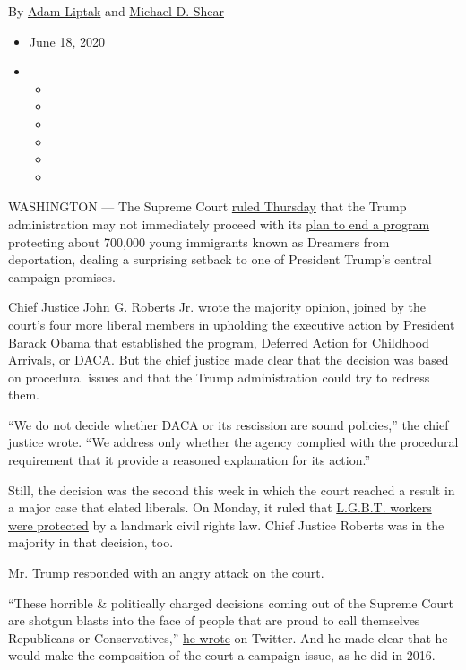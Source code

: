 By \href{https://www.nytimes3xbfgragh.onion/by/adam-liptak}{Adam Liptak}
and \href{https://www.nytimes3xbfgragh.onion/by/michael-d-shear}{Michael
D. Shear}

\begin{itemize}
\item
  June 18, 2020
\item
  \begin{itemize}
  \item
  \item
  \item
  \item
  \item
  \item
  \end{itemize}
\end{itemize}

WASHINGTON --- The Supreme Court
\href{https://www.supremecourt.gov/opinions/19pdf/18-587_5ifl.pdf}{ruled
Thursday} that the Trump administration may not immediately proceed with
its
\href{https://www.nytimes3xbfgragh.onion/2017/09/05/us/politics/trump-daca-dreamers-immigration.html}{plan
to end a program} protecting about 700,000 young immigrants known as
Dreamers from deportation, dealing a surprising setback to one of
President Trump's central campaign promises.

Chief Justice John G. Roberts Jr. wrote the majority opinion, joined by
the court's four more liberal members in upholding the executive action
by President Barack Obama that established the program, Deferred Action
for Childhood Arrivals, or DACA. But the chief justice made clear that
the decision was based on procedural issues and that the Trump
administration could try to redress them.

``We do not decide whether DACA or its rescission are sound policies,''
the chief justice wrote. ``We address only whether the agency complied
with the procedural requirement that it provide a reasoned explanation
for its action.''

Still, the decision was the second this week in which the court reached
a result in a major case that elated liberals. On Monday, it ruled that
\href{https://www.nytimes3xbfgragh.onion/2020/06/15/us/gay-transgender-workers-supreme-court.html}{L.G.B.T.
workers were protected} by a landmark civil rights law. Chief Justice
Roberts was in the majority in that decision, too.

Mr. Trump responded with an angry attack on the court.

``These horrible \& politically charged decisions coming out of the
Supreme Court are shotgun blasts into the face of people that are proud
to call themselves Republicans or Conservatives,''
\href{https://twitter.com/realDonaldTrump/status/1273633632742191106}{he
wrote} on Twitter. And he made clear that he would make the composition
of the court a campaign issue, as he did in 2016.

